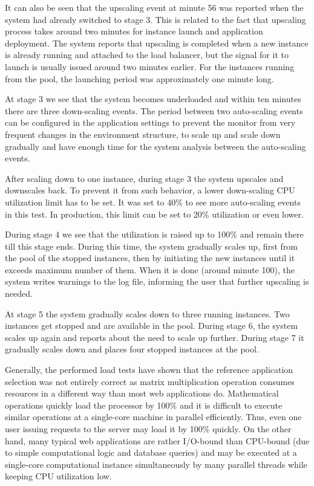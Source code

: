 \documentclass[conference]{IEEEtran}
\begin{document}
It can also be seen that the upscaling event at minute 56 was reported when the system had already switched to stage 3. This is related to the fact that upscaling process takes around two minutes for instance launch and application deployment. The system reports that upscaling is completed when a new instance is already running and attached to the load balancer, but the signal for it to launch is usually issued around two minutes earlier. For the instances running from the pool, the launching period was approximately one minute long.

At stage 3 we see that the system becomes underloaded and within ten minutes there are three down-scaling events. The period between two auto-scaling events can be configured in the application settings to prevent the monitor from very frequent changes in the environment structure, to scale up and scale down gradually and have enough time for the system analysis between the auto-scaling events. 

After scaling down to one instance, during stage 3 the system upscales and downscales back. To prevent it from such behavior, a lower down-scaling CPU utilization limit has to be set. It was set to 40\% to see more auto-scaling events in this test. In production, this limit can be set to 20\% utilization or even lower.

During stage 4 we see that the utilization is raised up to 100\% and remain there till this stage ends. During this time, the system gradually scales up, first from the pool of the stopped instances, then by initiating the new instances until it exceeds maximum number of them. When it is done (around minute 100), the system writes warnings to the log file, informing the user that further upscaling is needed.

At stage 5 the system gradually scales down to three running instances. Two instances get stopped and are available in the pool. During stage 6, the system scales up again and reports about the need to scale up further. During stage 7 it gradually scales down and places four stopped instances at the pool. 

Generally, the performed load tests have shown that the reference application selection was not entirely correct as matrix multiplication operation consumes resources in a different way than most web applications do. Mathematical operations quickly load the processor by 100\% and it is difficult to execute similar operations at a single-core machine in parallel efficiently. Thus, even one user issuing requests to the server may load it by 100\% quickly. On the other hand, many typical web applications are rather I/O-bound than CPU-bound (due to simple computational logic and database queries) and may be executed at a single-core computational instance simultaneously by many parallel threads while keeping CPU utilization low.
\end{document}
